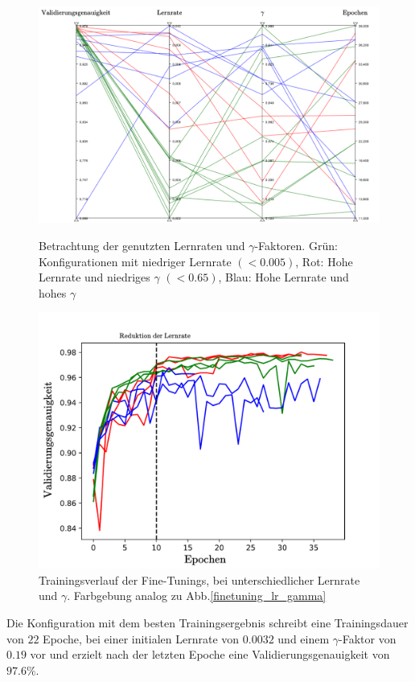 \begin{figure}[h]
\includegraphics[scale=0.58]{NNOPT/finetuning_lr_gamma.pdf}
\caption{Betrachtung der genutzten Lernraten und $\gamma$-Faktoren. Grün: Konfigurationen mit niedriger Lernrate $(<0.005)$, Rot: Hohe Lernrate und niedriges $\gamma$ $(<0.65)$, Blau: Hohe Lernrate und hohes $\gamma$}
\label{finetuning_lr_gamma}

\centering
\includegraphics[scale=0.6]{NNOPT/finetuning_lr_gamma_verlauf.pdf}
\caption{Trainingsverlauf der Fine-Tunings, bei unterschiedlicher Lernrate und $\gamma$. Farbgebung analog zu Abb.\ref{finetuning_lr_gamma}}
\label{finetuning_lr_gamma_verlauf}
\end{figure}
\clearpage
Die Konfiguration mit dem besten Trainingsergebnis schreibt eine Trainingsdauer von $22$ Epoche, bei einer initialen Lernrate von $0.0032$ und einem $\gamma$-Faktor von $0.19$ vor und erzielt nach der letzten Epoche eine Validierungsgenauigkeit von $97.6\%$.
